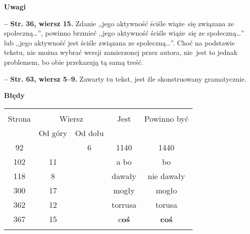 \documentclass[a4paper]{article}
\newcommand{\spaceTwo}{2em}
\newcommand{\tb}{\textbf}
\newcommand{\noi}{\noindent}
\newcommand{\start}{\noi \tb{--} {}}
\newcommand{\StrWg}[2]{\tb{Str. #1, wiersz #2.}}
\newcommand{\Center}[1]{\begin{center} #1 \end{center}}
\newcommand{\CenterTB}[1]{\Center{\tb{#1}}}
\newcommand{\Work}[1]{ \begin{center} {\large \tb{#1}} \end{center} }
\begin{document}
\CenterTB{Uwagi}

\start \StrWg{36}{15} Zdanie ,,jego aktywność ściśle wiąże~się
związana ze społeczną\ldots'', powinno brzmieć ,,jego aktywność ściśle
wiąże~się ze społeczną\ldots'' lub ,,jego aktywność jest ściśle
związana ze społeczną\ldots''. Choć na podstawie tekstu, nie można
wybrać wersji zamierzonej przez autora, nie~jest to jednak problemem,
bo obie przekazują tą samą treść.

\start \StrWg{63}{5--9} Zawarty tu tekst, jest źle skonstruowany
gramatycznie.

\CenterTB{Błędy}
\begin{center}
  \begin{tabular}{|c|c|c|c|c|}
    \hline
    & \multicolumn{2}{c|}{} & & \\
    Strona & \multicolumn{2}{c|}{Wiersz}& Jest & Powinno być \\ \cline{2-3}
    & Od góry & Od dołu &  &  \\ \hline
    92 & & 6 & 1140 & 1440 \\
    102 & 11 & & a bo & bo \\
    118 & 8 & & dawały & nie dawały \\
    300 & 17 & & mogły & mogło \\
    362 & 12 & & torrusa & torusa \\
    367 & 15 & & c\tb{oś} & \tb{coś} \\
    & & & & \\ \hline
  \end{tabular}
\end{center}

\vspace{\spaceTwo}







\end{document}
